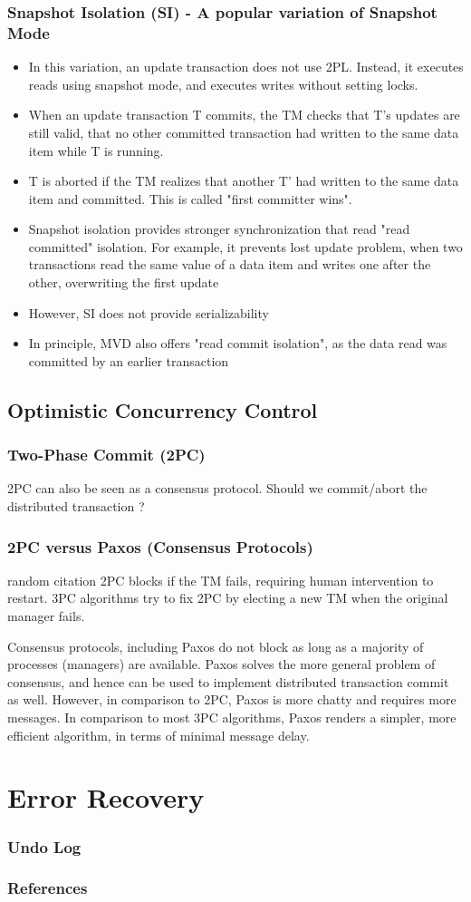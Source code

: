 \documentclass[12]{beamer}
\begin{document}
\begin{frame}
\frametitle{Snapshot Isolation (SI) - A popular variation of Snapshot Mode}
\begin{itemize}
\item In this variation, an update transaction does not use 2PL. Instead, it executes reads using snapshot mode, and executes writes without setting locks.
\item When an update transaction T commits, the TM checks that T's updates are still valid, that no other committed transaction had written to the same data item while T is running.
\item T is aborted if the TM realizes that another T' had written to the same data item and committed. This is called "first committer wins".
\item Snapshot isolation provides stronger synchronization that read "read committed" isolation. For example, it prevents lost update problem, when two transactions read the same value of a data item and writes one after the other, overwriting the first update
\item However, SI does not provide serializability
\item In principle, MVD also offers "read commit isolation", as the data read was committed by an earlier transaction
\end{itemize}
\end{frame}

\subsection{Optimistic Concurrency Control}

\begin{frame}
\frametitle{Two-Phase Commit (2PC)}
2PC can also be seen as a consensus protocol. Should we commit/abort the distributed transaction ?
\end{frame}

\begin{frame}
\frametitle{2PC versus Paxos (Consensus Protocols)}
random citation \cite{Bernstein:2009}
2PC blocks if the TM fails, requiring human intervention to restart. 3PC algorithms try to fix 2PC by electing a new TM when the original manager fails.
\vspace{10pt}

Consensus protocols, including Paxos do not block as long as a majority of processes (managers) are available. Paxos solves the more general problem of consensus, and hence can be used to implement distributed transaction commit as well. However, in comparison to 2PC, Paxos is more chatty and requires more messages. In comparison to most 3PC algorithms, Paxos renders a simpler, more efficient algorithm, in terms of minimal message delay.
\end{frame}

\section{Error Recovery}

\begin{frame}
  \frametitle{Undo Log}
\end{frame}

\begin{frame}
  \frametitle{References}
  \printbibliography
\end{frame}
\end{document}

